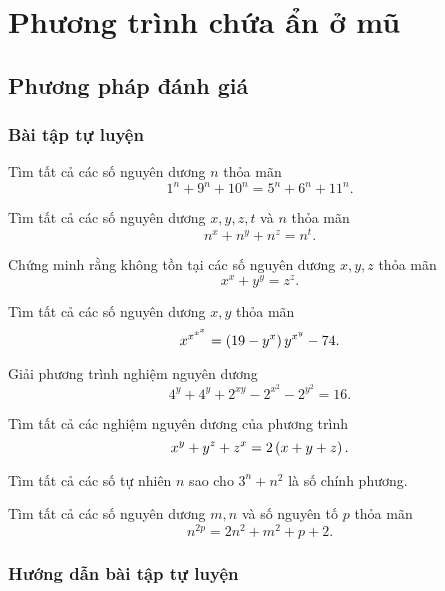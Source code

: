 \section{Phương trình chứa ẩn ở mũ}

\subsection{Phương pháp đánh giá}

\subsubsection*{Bài tập tự luyện}

\begin{btt}
Tìm tất cả các số nguyên dương $n$ thỏa mãn
\[1^n+9^n+10^n=5^n+6^n+11^n.\]
\end{btt}

\begin{btt}
Tìm tất cả các số nguyên dương $x,y,z,t$ và $n$ thỏa mãn
\[n^x+n^y+n^z=n^t.\]
\end{btt}

\begin{btt}
Chứng minh rằng không tồn tại các số nguyên dương $x,y,z$ thỏa mãn
\[x^x+y^y=z^z.\]
\end{btt}

\begin{btt}
Tìm tất cả các số nguyên dương $x,y$ thỏa mãn
\[x^{x^{x^{x}}}=\left(\displaystyle 19-y^x \right)y^{x^y}-74.\]
\end{btt}

\begin{btt}
Giải phương trình nghiệm nguyên dương  $$4^{y}+4^{y}+2^{xy}-2^{x^{2}}-2^{y^{2}}=16.$$
\end{btt}

\begin{btt}
Tìm tất cả các nghiệm nguyên dương của phương trình 
\[x^y+y^z+z^x=2\left(\displaystyle x+y+z \right).\]
\end{btt}

\begin{btt}
Tìm tất cả các số tự nhiên $n$ sao cho $3^n+n^2$ là số chính phương.
\end{btt}

\begin{btt}
Tìm tất cả các số nguyên dương $m,n$ và số nguyên tố $p$ thỏa mãn
\[n^{2p}=2n^2+m^2+p+2.\]
\end{btt}

\subsubsection*{Hướng dẫn bài tập tự luyện}

